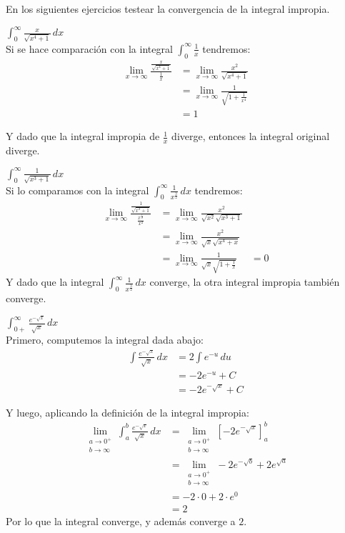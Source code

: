 \documentclass[../main.tex]{subfiles}
\begin{document}
En los siguientes ejercicios testear la convergencia de la integral impropia.

\question $\int_{0}^\infty \frac{x}{\sqrt{x^4+1}} \, dx$\\

Si se hace comparación con la integral $\int_{0}^\infty \frac{1}{x}$ tendremos:
\begin{align*}
    \lim_{x \to \infty} \frac{\frac{x}{\sqrt{x^4+1}}}{\frac{1}{x}} &= \lim_{x \to \infty} \frac{x^2}{\sqrt{x^4 + 1}}\\
    &= \lim_{x \to \infty} \frac{1}{\sqrt{1 + \frac{1}{x^4}}}\\
    &= 1
\end{align*}

Y dado que la integral impropia de $\frac{1}{x}$ diverge, entonces la integral original diverge.


\question $\int_{0}^\infty \frac{1}{\sqrt{x^3+1}} \, dx$\\

Si lo comparamos con la integral $\int_{0}^\infty \frac{1}{x^\frac{3}{2}}\, dx$ tendremos:
\begin{align*}
    \lim_{x \to \infty} \frac{\frac{1}{\sqrt{x^3+1}}}{\frac{x^{\frac{1}{2}}}{x^{2}}} &= \lim_{x \to \infty} \frac{x^2}{\sqrt{x^2}\sqrt{x^3 + 1}}\\
    &= \lim_{x \to \infty} \frac{x^2}{\sqrt{x} \sqrt{x^4 + x}}\\
    &= \lim_{x \to \infty} \frac{1}{\sqrt{x} \sqrt{1 + \frac{1}{x}}}
    &= 0
\end{align*}
Y dado que la integral $\int_{0}^\infty \frac{1}{x^{\frac{3}{2}}}\, dx$ converge, la otra integral impropia también converge.

\question $\int_{0+}^\infty \frac{e^{-\sqrt{x}}}{\sqrt{x}} \, dx$\\

Primero, computemos la integral dada abajo:
\begin{align*}
    \int \frac{e^{-\sqrt{x}}}{\sqrt{x}} \, dx &= 2\int e^{-u} \, du\\
    &= -2e^{-u} + C\\
    &= -2e^{-\sqrt{x}} + C
\end{align*}

Y luego, aplicando la definición de la integral impropia:
\begin{align*}
    \lim_{\substack{a \to 0^+ \\ b \to \infty}} \int_{a}^b \frac{e^{-\sqrt{x}}}{\sqrt{x}} \, dx &= \lim_{\substack{a \to 0^+ \\ b \to \infty}} \left[-2e^{-\sqrt{x}}\right]_{a}^b\\
    &=  \lim_{\substack{a \to 0^+ \\ b \to \infty}} -2e^{-\sqrt{b}} + 2e^{\sqrt{a}}\\
    &= -2 \cdot 0 + 2 \cdot e^0\\
    &= 2
\end{align*}
Por lo que la integral converge, y además converge a $2$.
\end{document}

